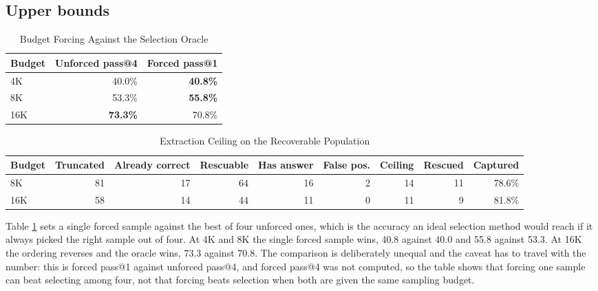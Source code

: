 \documentclass[conference]{IEEEtran}
\begin{document}
\subsection{Upper bounds}

\begin{table}[t]
\caption{Budget Forcing Against the Selection Oracle}
\label{tab:oracle}
\centering
\footnotesize
\begin{tabular}{@{}lrr@{}}
\toprule
\textbf{Budget} & \textbf{Unforced pass@4} & \textbf{Forced pass@1} \\
\midrule
4K  & 40.0\% & \textbf{40.8\%} \\
8K  & 53.3\% & \textbf{55.8\%} \\
16K & \textbf{73.3\%} & 70.8\% \\
\bottomrule
\end{tabular}
\end{table}

\begin{table}[t]
\caption{Extraction Ceiling on the Recoverable Population}
\label{tab:ceiling}
\centering
\footnotesize
\begin{tabular}{@{}lrrrrrrrr@{}}
\toprule
\textbf{Budget} & \textbf{Truncated} & \textbf{Already correct} &
\textbf{Rescuable} & \textbf{Has answer} & \textbf{False pos.} &
\textbf{Ceiling} & \textbf{Rescued} & \textbf{Captured} \\
\midrule
8K  & 81 & 17 & 64 & 16 & 2 & 14 & 11 & 78.6\% \\
16K & 58 & 14 & 44 & 11 & 0 & 11 &  9 & 81.8\% \\
\bottomrule
\end{tabular}
\end{table}

Table \ref{tab:oracle} sets a single forced sample against the best of four
unforced ones, which is the accuracy an ideal selection method would reach if it
always picked the right sample out of four. At 4K and 8K the single forced sample
wins, 40.8 against 40.0 and 55.8 against 53.3. At 16K the ordering reverses and
the oracle wins, 73.3 against 70.8. The comparison is deliberately unequal and the
caveat has to travel with the number: this is forced pass@1 against unforced
pass@4, and forced pass@4 was not computed, so the table shows that forcing one
sample can beat selecting among four, not that forcing beats selection when both
are given the same sampling budget.
\end{document}
